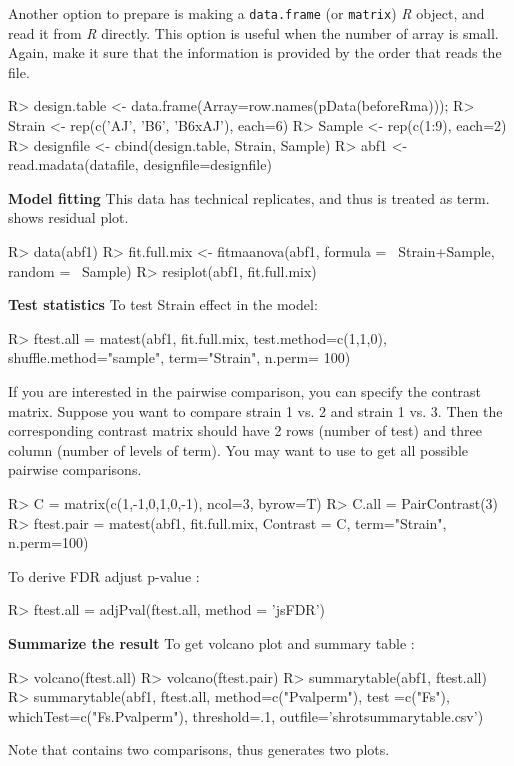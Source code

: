 Another option to prepare  is making a {\tt data.frame}
(or {\tt matrix}) {\em R} object, and read it from {\em R} directly. This option is useful when the number of array is small. Again, make it sure that the information is provided by the order that  reads the file.  
\begin{Sinput}
R> design.table <- data.frame(Array=row.names(pData(beforeRma)));
R> Strain <- rep(c('AJ', 'B6', 'B6xAJ'), each=6)
R> Sample <- rep(c(1:9), each=2)
R> designfile <- cbind(design.table, Strain, Sample)
R> abf1 <- read.madata(datafile, designfile=designfile)
\end{Sinput}
{\bf Model fitting} This data has technical replicates, and thus  is treated as  term.  shows residual plot. 
\begin{Sinput}
R> data(abf1)
R> fit.full.mix <- fitmaanova(abf1, formula = ~Strain+Sample, 
   random = ~Sample)
R> resiplot(abf1, fit.full.mix)
\end{Sinput}
{\bf Test statistics} To test Strain effect in the model:
\begin{Sinput}
R> ftest.all = matest(abf1, fit.full.mix, test.method=c(1,1,0),
    shuffle.method="sample", term="Strain", n.perm= 100)
\end{Sinput}
If you are interested in the pairwise comparison, you can specify the contrast
matrix. Suppose you want to compare strain 1 vs. 2 and
strain 1 vs. 3. Then the corresponding contrast matrix should have 2 rows
(number of test) and three column (number of levels of
term). You may want to use  to get all possible pairwise comparisons.  
\begin{Sinput}
R> C = matrix(c(1,-1,0,1,0,-1), ncol=3, byrow=T)
R> C.all = PairContrast(3)
R> ftest.pair = matest(abf1, fit.full.mix, Contrast = C, 
   term="Strain", n.perm=100)
\end{Sinput}
To derive FDR adjust p-value :
\begin{Sinput}
R> ftest.all = adjPval(ftest.all, method = 'jsFDR')
\end{Sinput}
{\bf Summarize the result} To get volcano plot and summary table :  
\begin{Sinput}
R> volcano(ftest.all)
R> volcano(ftest.pair)
R> summarytable(abf1, ftest.all)
R> summarytable(abf1, ftest.all, method=c("Pvalperm"), test =c("Fs"), 
   whichTest=c("Fs.Pvalperm"), threshold=.1, outfile='shrotsummarytable.csv')
\end{Sinput}
Note that  contains two comparisons, thus
 generates two plots. 
